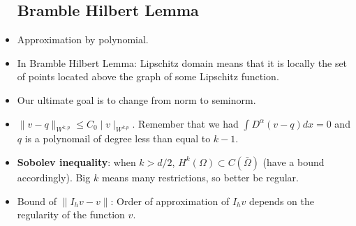 \documentclass{article}
\theoremstyle{remark}
\begin{document}
\begin{itemize}
    \subsection*{Bramble Hilbert Lemma}
    \item Approximation by polynomial.
       \item In Bramble Hilbert Lemma: Lipschitz domain means that it is locally the set of points located above the graph of some Lipschitz function.
       \item Our ultimate goal is to change from norm to seminorm. 
       \item $\lVert v-q\rVert_{W^{k,p}}\leq  C_0\mid v\mid_{W^{k.p}}$. Remember that we had $\int D^\alpha (v-q)dx=0$ and $q$ is a polynomail of degree less than equal to $k-1$.
       \item \textbf{Sobolev inequality}: when $k>d/2$, $H^k(\Omega)\subset C(\bar\Omega)$ (have a bound accordingly). Big $k$ means many restrictions, so better be regular.
           \item Bound of $\lVert I_h v-v\rVert$: Order of approximation of $I_h v$ depends on the regularity of the function $v$.

\end{itemize}
\end{document}
